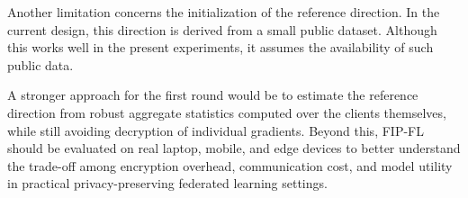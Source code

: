 Another limitation concerns the initialization of the reference direction. In the current design, this direction is derived from a small public dataset. Although this works well in the present experiments, it assumes the availability of such public data.

A stronger approach for the first round would be to estimate the reference direction from robust aggregate statistics computed over the clients themselves, while still avoiding decryption of individual gradients. Beyond this, FIP-FL should be evaluated on real laptop, mobile, and edge devices to better understand the trade-off among encryption overhead, communication cost, and model utility in practical privacy-preserving federated learning settings.
